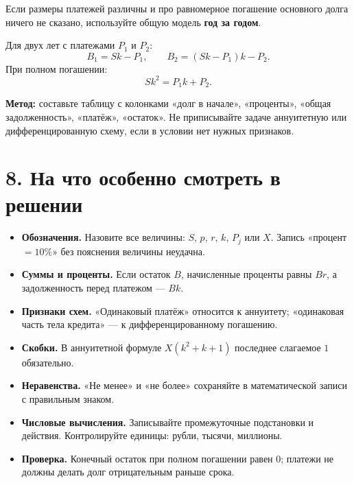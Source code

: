 \documentclass[a4paper,12pt]{article}
\newcommand{\key}[1]{\textcolor{darkaccent}{\textbf{#1}}}
\newcommand{\fboxeq}[1]{\[\boxed{#1}\]}
\begin{document}
Если размеры платежей различны и про равномерное погашение основного долга ничего не сказано, используйте общую модель \key{год за годом}.

Для двух лет с платежами $P_1$ и $P_2$:
\[
 B_1=Sk-P_1,\qquad B_2=(Sk-P_1)k-P_2.
\]
При полном погашении:
\fboxeq{Sk^2=P_1k+P_2.}

\key{Метод:} составьте таблицу с колонками «долг в начале», «проценты», «общая задолженность», «платёж», «остаток». Не приписывайте задаче аннуитетную или дифференцированную схему, если в условии нет нужных признаков.

\section*{8. На что особенно смотреть в решении}

\begin{itemize}
\item \key{Обозначения.} Назовите все величины: $S$, $p$, $r$, $k$, $P_j$ или $X$. Запись «процент $=10\%$» без пояснения величины неудачна.
\item \key{Суммы и проценты.} Если остаток $B$, начисленные проценты равны $Br$, а задолженность перед платежом --- $Bk$.
\item \key{Признаки схем.} «Одинаковый платёж» относится к аннуитету; «одинаковая часть тела кредита» --- к дифференцированному погашению.
\item \key{Скобки.} В аннуитетной формуле $X(k^2+k+1)$ последнее слагаемое $1$ обязательно.
\item \key{Неравенства.} «Не менее» и «не более» сохраняйте в математической записи с правильным знаком.
\item \key{Числовые вычисления.} Записывайте промежуточные подстановки и действия. Контролируйте единицы: рубли, тысячи, миллионы.
\item \key{Проверка.} Конечный остаток при полном погашении равен $0$; платежи не должны делать долг отрицательным раньше срока.
\end{itemize}
\end{document}
